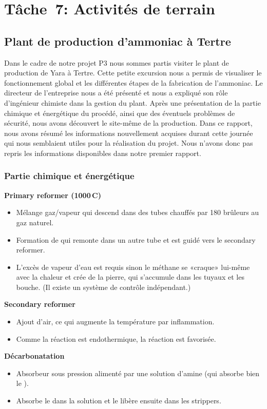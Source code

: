 \chapter{Tâche~7: Activités de terrain}

\section{Plant de production d'ammoniac à Tertre}
Dans le cadre de notre projet P3 nous sommes partis visiter le plant de production de Yara à Tertre. Cette petite excursion nous a permis de visualiser le fonctionnement global et les différentes étapes de la fabrication de l'ammoniac. Le directeur de l'entreprise nous a été présenté et nous a expliqué son rôle d'ingénieur chimiste dans la gestion du plant. Après une présentation de la partie chimique et énergétique du procédé, ainsi que des éventuels problèmes de sécurité, nous avons découvert le site-même de la production. Dans ce rapport, nous avons résumé les informations nouvellement acquises durant cette journée qui nous semblaient utiles pour la réalisation du projet. Nous n'avons donc pas repris les informations disponibles dans notre premier rapport.
\subsection{Partie chimique et énergétique}
\textbf{Primary reformer (1000\,\degree C)}
\begin{itemize}
\item Mélange gaz/vapeur qui descend dans des tubes chauffés par 180 brûleurs au gaz naturel.
\item Formation de  qui remonte dans un autre tube et est guidé vers le secondary reformer.
\item L'excès de vapeur d'eau est requis sinon le méthane se «craque» lui-même avec la chaleur et crée de la pierre, qui s'accumule dans les tuyaux et les bouche. (Il existe un système de contrôle indépendant.)
\end{itemize}

\textbf{Secondary reformer }
\begin{itemize}
\item Ajout d'air, ce qui augmente la température par inflammation.
\item Comme la réaction est endothermique, la réaction est favorisée.
\end{itemize}

\textbf{Décarbonatation}
\begin{itemize}
\item Absorbeur sous pression alimenté par une solution d'amine (qui absorbe bien le ).
\item Absorbe le  dans la solution et le libère ensuite dans les strippers.
\end{itemize}

